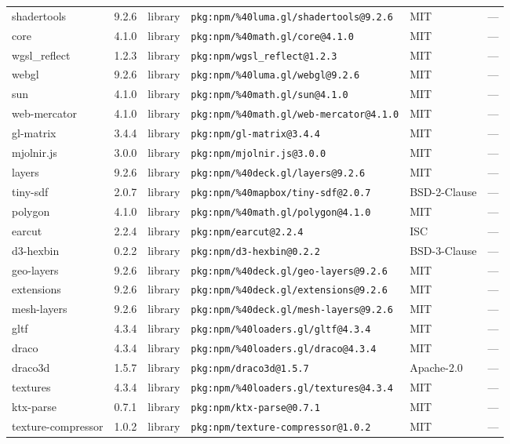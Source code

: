 \documentclass[11pt]{article}
\begin{document}
\begin{longtable}{|l|l|l|p{2.2cm}|l|p{4cm}|}
shadertools & 9.2.6 & library & \texttt{pkg:npm/\%40luma.gl/shadertools@9.2.6} & MIT & — \\
core & 4.1.0 & library & \texttt{pkg:npm/\%40math.gl/core@4.1.0} & MIT & — \\
wgsl\_reflect & 1.2.3 & library & \texttt{pkg:npm/wgsl\_reflect@1.2.3} & MIT & — \\
webgl & 9.2.6 & library & \texttt{pkg:npm/\%40luma.gl/webgl@9.2.6} & MIT & — \\
sun & 4.1.0 & library & \texttt{pkg:npm/\%40math.gl/sun@4.1.0} & MIT & — \\
web-mercator & 4.1.0 & library & \texttt{pkg:npm/\%40math.gl/web-mercator@4.1.0} & MIT & — \\
gl-matrix & 3.4.4 & library & \texttt{pkg:npm/gl-matrix@3.4.4} & MIT & — \\
mjolnir.js & 3.0.0 & library & \texttt{pkg:npm/mjolnir.js@3.0.0} & MIT & — \\
layers & 9.2.6 & library & \texttt{pkg:npm/\%40deck.gl/layers@9.2.6} & MIT & — \\
tiny-sdf & 2.0.7 & library & \texttt{pkg:npm/\%40mapbox/tiny-sdf@2.0.7} & BSD-2-Clause & — \\
polygon & 4.1.0 & library & \texttt{pkg:npm/\%40math.gl/polygon@4.1.0} & MIT & — \\
earcut & 2.2.4 & library & \texttt{pkg:npm/earcut@2.2.4} & ISC & — \\
d3-hexbin & 0.2.2 & library & \texttt{pkg:npm/d3-hexbin@0.2.2} & BSD-3-Clause & — \\
geo-layers & 9.2.6 & library & \texttt{pkg:npm/\%40deck.gl/geo-layers@9.2.6} & MIT & — \\
extensions & 9.2.6 & library & \texttt{pkg:npm/\%40deck.gl/extensions@9.2.6} & MIT & — \\
mesh-layers & 9.2.6 & library & \texttt{pkg:npm/\%40deck.gl/mesh-layers@9.2.6} & MIT & — \\
gltf & 4.3.4 & library & \texttt{pkg:npm/\%40loaders.gl/gltf@4.3.4} & MIT & — \\
draco & 4.3.4 & library & \texttt{pkg:npm/\%40loaders.gl/draco@4.3.4} & MIT & — \\
draco3d & 1.5.7 & library & \texttt{pkg:npm/draco3d@1.5.7} & Apache-2.0 & — \\
textures & 4.3.4 & library & \texttt{pkg:npm/\%40loaders.gl/textures@4.3.4} & MIT & — \\
ktx-parse & 0.7.1 & library & \texttt{pkg:npm/ktx-parse@0.7.1} & MIT & — \\
texture-compressor & 1.0.2 & library & \texttt{pkg:npm/texture-compressor@1.0.2} & MIT & — \\

\end{longtable}
\end{document}
